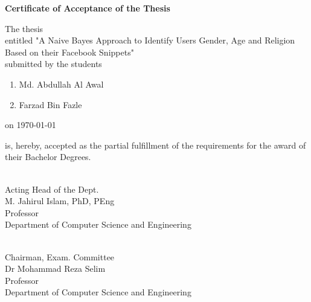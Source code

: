 \documentclass{standalone}
\begin{document}
\begin{titlepage}
				\newpage
				\begin{center}
					\textbf{\huge Certificate of Acceptance of the Thesis}
				\end{center}
				
				\noindent
				The thesis
				\\
				entitled "{A Naive Bayes Approach to Identify Users Gender, Age and Religion Based on their Facebook Snippets}"
				\\
				submitted by the students
				\begin{enumerate}
					\item Md. Abdullah Al Awal
					\item Farzad Bin Fazle
				\end{enumerate}
				on \today
				
				\noindent
				is, hereby, accepted as the partial fulfillment of the requirements for the award of their Bachelor Degrees.
				\vspace{2.0cm}
				
				\begin{multicols}{3}
				
				\begin{flushleft}
				\hrulefill \\
				{\hspace{0.5mm}Acting Head of the Dept.\\\hspace{0.5mm}M. Jahirul Islam, PhD, PEng \\\hspace{0.5mm}Professor\\\hspace{0.5mm}Department of Computer Science and Engineering}\\
				
				\end{flushleft}
				
				\begin{flushleft}
				\hrulefill \\
					{\hspace{0.5mm}Chairman, Exam. Committee\\\hspace{0.5mm}Dr Mohammad Reza Selim\\\hspace{0.5mm}Professor\\\hspace{0.5mm}Department of Computer Science and Engineering}\\%
					

\end{flushleft}
\end{multicols}
\end{titlepage}
\end{document}
